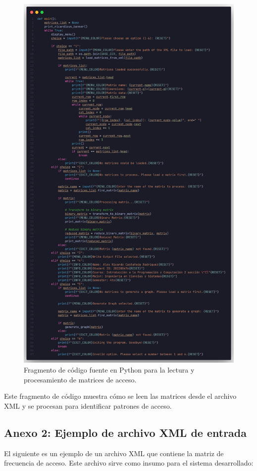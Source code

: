 \documentclass[letterpaper,12pt]{article}
\begin{document}
\begin{multicols}{2}
    \begin{figure}
        \centering
        \includegraphics[width=\columnwidth]{images/screenshot_code.png}
        \caption{Fragmento de código fuente en Python para la lectura y procesamiento de matrices de acceso.}
    \end{figure}

    Este fragmento de código muestra cómo se leen las matrices desde el archivo XML y se procesan para identificar patrones de acceso.

    \subsection*{Anexo 2: Ejemplo de archivo XML de entrada}
    El siguiente es un ejemplo de un archivo XML que contiene la matriz de frecuencia de acceso. Este archivo sirve como insumo para el sistema desarrollado:


\end{multicols}
\end{document}
